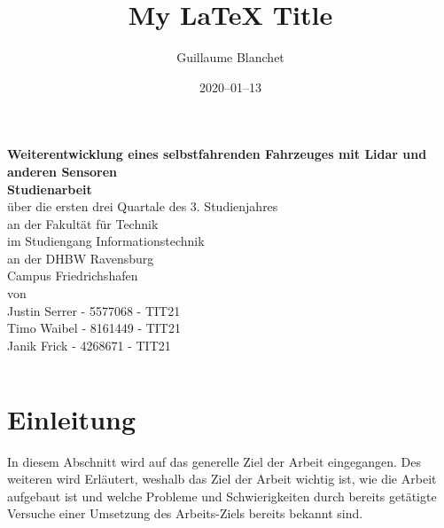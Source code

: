\documentclass[12pt]{article}
\title{My LaTeX Title}
\author{Guillaume Blanchet}
\date{2020–01–13}
\begin{document}

\begin{titlepage}
	\begin{minipage}{6in}
	\vspace*{-2cm}
    \centering
    \raisebox{-0.5\height}{}
    \hfill
    \end{minipage}
	\begin{center}
		\vspace*{0.5cm}
		\LARGE\textbf{Weiterentwicklung eines selbstfahrenden Fahrzeuges mit Lidar
        und anderen Sensoren}\\
		\vspace*{2cm}
		\textbf{Studienarbeit}\\
		\normalsize
		{\"u}ber die ersten drei Quartale des 3. Studienjahres\\
		\vspace*{1.3cm}
		an der Fakult{\"a}t f{\"u}r Technik\\
		im Studiengang Informationstechnik\\
		\vspace*{1cm}
		an der DHBW Ravensburg\\
		Campus Friedrichshafen\\
		\vspace*{1cm}
		von\\
		Justin Serrer - 5577068 - TIT21 \\ 
		Timo Waibel - 8161449 - TIT21 \\
		Janik Frick - 4268671 - TIT21 \\
		\vspace*{2cm}
		\vfill
	\end{center}
	\begin{tabular}{ll}
	\end{tabular}
\end{titlepage}
\newpage
\tableofcontents
\newpage
\listoffigures
\newpage

\section{Einleitung}
In diesem Abschnitt wird auf das generelle Ziel der Arbeit eingegangen.
Des weiteren wird Erläutert, weshalb das Ziel der Arbeit wichtig ist, wie die Arbeit aufgebaut ist und welche Probleme und Schwierigkeiten durch bereits getätigte Versuche einer Umsetzung des Arbeits-Ziels bereits bekannt sind.
\end{document}
